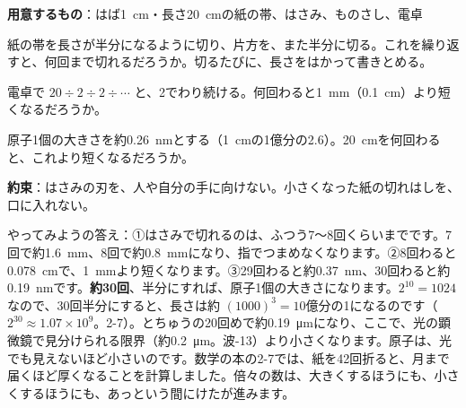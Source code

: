 \begin{yattemiyou}
\textbf{用意するもの}：はば\qty{1}{cm}・長さ\qty{20}{cm}の紙の帯、はさみ、ものさし、電卓\par\vspace{2pt}
\noindent\begin{minipage}[c]{0.62\linewidth}
\begin{enumerate}[label={\bkcircled[bkGreen]{\arabic*}}, leftmargin=2.4\zw, itemsep=1pt, topsep=0pt]
\item 紙の帯を長さが半分になるように切り、片方を、また半分に切る。これを繰り返すと、何回まで切れるだろうか。切るたびに、長さをはかって書きとめる。
\item 電卓で $20\div2\div2\div\cdots$ と、2でわり続ける。何回わると\qty{1}{mm}（\qty{0.1}{cm}）より短くなるだろうか。
\item 原子1個の大きさを約\qty{0.26}{nm}とする（\qty{1}{cm}の1億分の2.6）。\qty{20}{cm}を何回わると、これより短くなるだろうか。
\end{enumerate}
\end{minipage}\hfill
\begin{minipage}[c]{0.35\linewidth}\centering
{}
\end{minipage}\par\vspace{5pt}
\noindent\textbf{約束}：はさみの刃を、人や自分の手に向けない。小さくなった紙の切れはしを、口に入れない。
\end{yattemiyou}

\noindent やってみようの答え：①はさみで切れるのは、ふつう7〜8回くらいまでです。7回で約\qty{1.6}{mm}、8回で約\qty{0.8}{mm}になり、指でつまめなくなります。②8回わると\qty{0.078}{cm}で、\qty{1}{mm}より短くなります。③29回わると約\qty{0.37}{nm}、30回わると約\qty{0.19}{nm}です。\textbf{約30回}、半分にすれば、原子1個の大きさになります。$2^{10}=1024$ なので、30回半分にすると、長さは約 $(1000)^3=10$億分の1になるのです（$2^{30}\approx1.07\times10^9$。2-7）。とちゅうの20回めで約\qty{0.19}{\micro m}になり、ここで、光の顕微鏡で見分けられる限界（約\qty{0.2}{\micro m}。波-13）より小さくなります。原子は、光でも見えないほど小さいのです。数学の本の2-7では、紙を42回折ると、月まで届くほど厚くなることを計算しました。倍々の数は、大きくするほうにも、小さくするほうにも、あっという間にけたが進みます。

